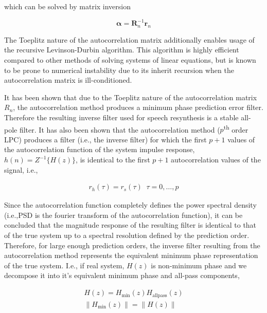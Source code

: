 \noindent
which can be solved by matrix inversion

\begin{equation}
	 \boldsymbol{\alpha} = \boldsymbol{R}_n^{-1} \boldsymbol{r}_n
\end{equation}

The Toeplitz nature of the autocorrelation matrix additionally enables usage of the recursive Levinson-Durbin algorithm. This algorithm is highly efficient compared to other methods of solving systems of linear equations, but is known to be prone to numerical instability due to its inherit recursion when the autocorrelation matrix is ill-conditioned.

It has been shown that due to the Toeplitz nature of the autocorrelation matrix $R_n$, the autocorrelation method produces a minimum phase prediction error filter. Therefore the resulting inverse filter used for speech resynthesis is a stable all-pole filter. It has also been shown that the autocorrelation method ($p$\textsuperscript{th} order LPC) produces a filter (i.e., the inverse filter) for which the first $p+1$ values of the autocorrelation function of the system impulse response, $h(n)=Z^{-1}\{H(z)\}$, is identical to the first $p+1$ autocorrelation values of the signal, i.e.,

\begin{eqnarray}
	r_h(\tau) = r_s(\tau) \;\; \tau=0, \dots, p
\end{eqnarray}

\noindent
Since the autocorrelation function completely defines the power spectral density (i.e.,PSD is the fourier transform of the autocorrelation function), it can be concluded that the magnitude response of the resulting filter is identical to that of the true system up to a spectral resolution defined by the prediction order. Therefore, for large enough prediction orders, the inverse filter resulting from the autocorrelation method represents the equivalent minimum phase representation of the true system. I.e., if real system, $H(z)$ is non-minimum phase and we decompose it into it's equivalent minimum phase and all-pass components,

\begin{eqnarray}
	H(z) = H_{\mathrm{min}}(z) H_{\mathrm{allpass}}(z) \\
	\| H_{\mathrm{min}}(z) \| = \| H(z) \|  \\
\end{eqnarray}

